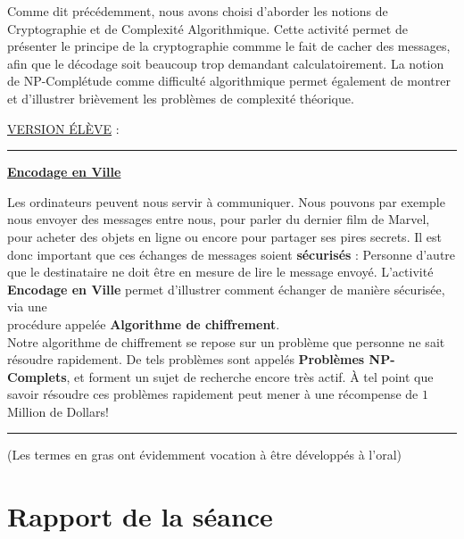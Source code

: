 \documentclass{article}
\begin{document}
Comme dit précédemment, nous avons choisi d'aborder les notions de Cryptographie et de Complexité Algorithmique. Cette activité permet de présenter le principe de la cryptographie commme le fait de cacher des messages, afin que le décodage soit beaucoup trop demandant calculatoirement. La notion de NP-Complétude comme difficulté algorithmique permet également de montrer et d'illustrer brièvement les problèmes de complexité théorique.

\bigskip

\underline{VERSION ÉLÈVE} :\\

\hrule

\vspace{2em}

\begin{center}
\Large{\textbf{\underline{Encodage en Ville}}}
\end{center}\Large{
Les ordinateurs peuvent nous servir à communiquer. Nous pouvons par exemple nous envoyer des messages entre nous, pour parler du dernier film de Marvel, pour acheter des objets en ligne ou encore pour partager ses pires secrets. Il est donc important que ces échanges de messages soient \textbf{sécurisés} : Personne d'autre que le destinataire ne doit être en mesure de lire le message envoyé. L'activité \textbf{Encodage en Ville} permet d'illustrer comment échanger de manière sécurisée, via une\\ procédure appelée \textbf{Algorithme de chiffrement}.\\

Notre algorithme de chiffrement se repose sur un problème que personne ne sait résoudre rapidement. De tels problèmes sont appelés \textbf{Problèmes NP-Complets}, et forment un sujet de recherche encore très actif. À tel point que savoir résoudre ces problèmes rapidement peut mener à une récompense de $1$ Million de Dollars!

}


\vspace{2em}
\hrule
\vspace{1em}

\normalsize{(Les termes en gras ont évidemment vocation à être développés à l'oral)}

\vspace{2em}

\section{Rapport de la séance}
\end{document}
